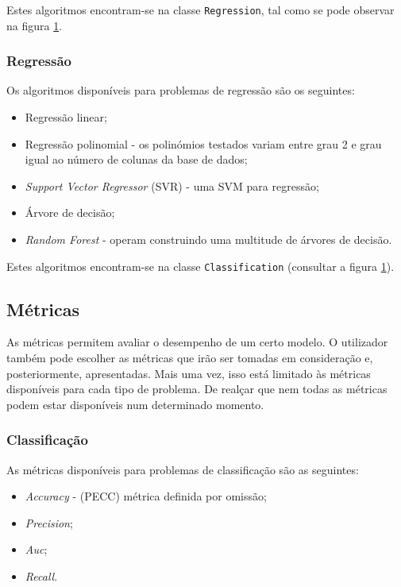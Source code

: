 \documentclass[a4paper]{report}
\begin{document}
{			Estes algoritmos encontram-se na classe \texttt{Regression}, tal como se pode observar na figura \hyperref[fig:1]{1}.

			\subsubsection{Regressão} \label{sssec:Regression1}
			Os algoritmos disponíveis para problemas de regressão são os seguintes:
			\begin{itemize}
				\item Regressão linear;
				\item Regressão polinomial - os polinómios testados variam entre grau 2 e grau igual ao número de colunas da base de dados;
				\item \textit{Support Vector Regressor} (SVR) - uma SVM para regressão;
				\item Árvore de decisão;
				\item \textit{Random Forest} - operam construindo uma multitude de árvores de decisão.
			\end{itemize}

			Estes algoritmos encontram-se na classe \texttt{Classification} (consultar a figura \hyperref[fig:1]{1}).

		\subsection{Métricas} \label{subsec:Metrics}
		As métricas permitem avaliar o desempenho de um certo modelo. 
		O utilizador também pode escolher as métricas que irão ser tomadas em consideração e, posteriormente, apresentadas.
		Mais uma vez, isso está limitado às métricas disponíveis para cada tipo de problema.
		De realçar que nem todas as métricas podem estar disponíveis num determinado momento.

            \subsubsection{Classificação} \label{sssec:Classification2}
			As métricas disponíveis para problemas de classificação são as seguintes:
			\begin{itemize}
				\item \textit{Accuracy} - (PECC) métrica definida por omissão;
				\item \textit{Precision};
				\item \textit{Auc};
				\item \textit{Recall}.
			\end{itemize}

}
\end{document}
